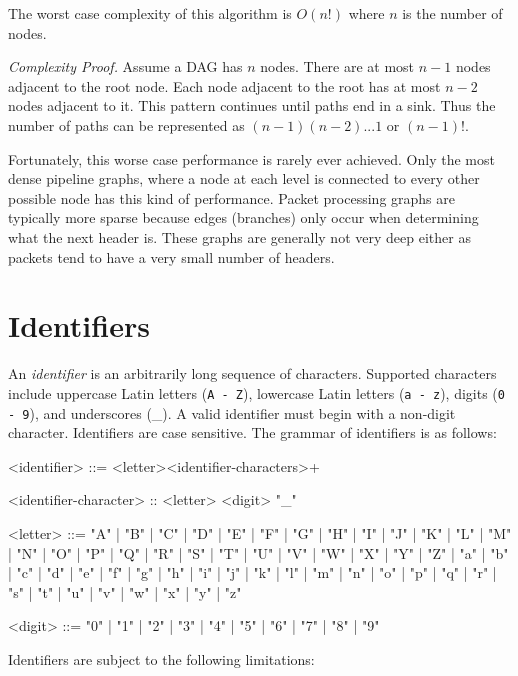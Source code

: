 The worst case complexity of this algorithm is $O(n!)$ where $n$ is the number of nodes.

\textit{Complexity Proof.} Assume a DAG has $n$ nodes. There are at most $n-1$ nodes adjacent to the root node. Each node adjacent to the root has at most $n-2$ nodes adjacent to it. This pattern continues until paths end in a sink. Thus the number of paths can be represented as $(n-1)(n-2)...1$ or $(n-1)!$.

Fortunately, this worse case performance is rarely ever achieved. Only the most dense pipeline graphs, where a node at each level is connected to every other possible node has this kind of performance. Packet processing graphs are typically more sparse because edges (branches) only occur when determining what the next header is. These graphs are generally not very deep either as packets tend to have a very small number of headers.

\section{Identifiers} \label{guide:identifiers}

An \textit{identifier} is an arbitrarily long sequence of characters. Supported characters include uppercase Latin letters (\texttt{A - Z}), lowercase Latin letters (\texttt{a - z}), digits (\texttt{0 - 9}), and underscores (\_). A valid identifier must begin with a non-digit character. Identifiers are case sensitive. The grammar of identifiers is as follows:

\begin{minip}
\begin{grammar}
<identifier> ::= <letter><identifier-characters>+

<identifier-character> :: <letter>
\alt <digit>
\alt "_"

<letter> ::= "A" | "B" | "C" | "D" | "E" | "F" | "G"
       | "H" | "I" | "J" | "K" | "L" | "M" | "N"
       | "O" | "P" | "Q" | "R" | "S" | "T" | "U"
       | "V" | "W" | "X" | "Y" | "Z" | "a" | "b"
       | "c" | "d" | "e" | "f" | "g" | "h" | "i"
       | "j" | "k" | "l" | "m" | "n" | "o" | "p"
       | "q" | "r" | "s" | "t" | "u" | "v" | "w"
       | "x" | "y" | "z"

<digit> ::= "0" | "1" | "2" | "3" | "4" | "5" | "6" | "7" | "8" | "9"
\end{grammar}
\end{minip}

Identifiers are subject to the following limitations:

